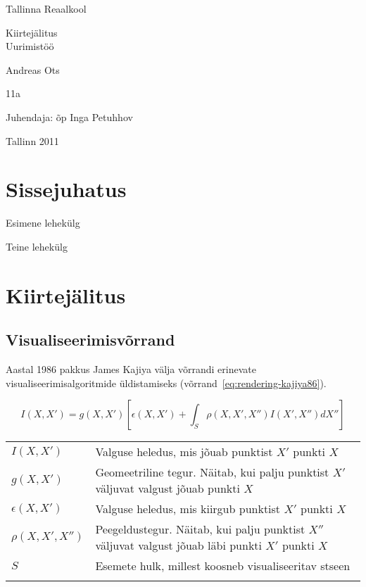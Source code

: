 \documentclass[a4paper,12pt]{report}
\begin{document}
\begin{center}
Tallinna Reaalkool

\vfill

Kiirtejälitus\\
Uurimistöö

\vfill

\end{center}

\begin{raggedleft}

Andreas Ots

11a

Juhendaja: õp Inga Petuhhov

\end{raggedleft}

\vfill

\begin{center}

Tallinn 2011

\end{center}
\clearpage

\tableofcontents
\listoffigures
\listoftables

\chapter*{Sissejuhatus}
\pagestyle{plain}
\thispagestyle{empty}
Esimene lehekülg

\clearpage

Teine lehekülg

\chapter{Kiirtejälitus}
\section{Visualiseerimisvõrrand}
Aastal 1986 pakkus James Kajiya välja võrrandi erinevate
visualiseerimisalgoritmide ül\-dis\-ta\-mi\-seks
(võrrand~\ref{eq:rendering-kajiya86}). \cite{kajiya86}

\begin{equation} \label{eq:rendering-kajiya86}
I(X, X') = g(X, X')\left[\epsilon(X, X')+\int_S\rho(X, X', X'')
I(X', X'')dX''\right]
\end{equation}

\begin{tabular}{l p{}}
\(I(X, X')\) & Valguse heledus, mis jõuab punktist \(X'\) punkti \(X\)\\
\(g(X, X')\) & Geomeetriline tegur. Näitab, kui palju punktist \(X'\)
	väljuvat valgust jõuab punkti \(X\) \\
\(\epsilon(X, X')\) & Valguse heledus, mis kiirgub punktist \(X'\)
	punkti \(X\) \\
\(\rho(X, X', X'')\) & Peegeldustegur. Näitab, kui palju punktist
	\(X''\) väljuvat valgust jõuab läbi punkti \(X'\) punkti \(X\) \\
\(S\) & Esemete hulk, millest koosneb visualiseeritav stseen \\
 & \\
\end{tabular}
\end{document}
